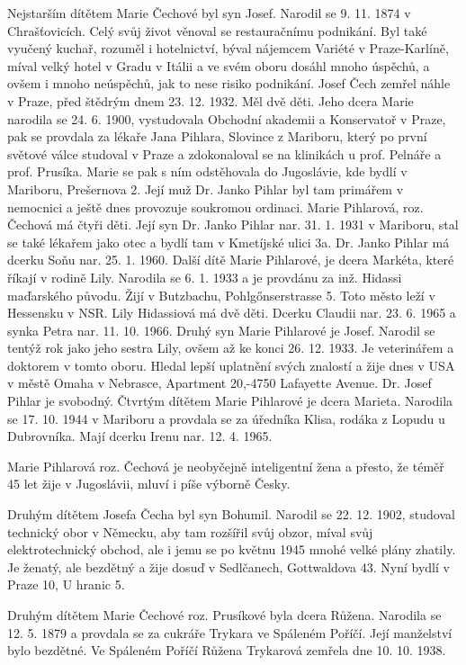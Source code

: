 \documentclass[../dejiny-rodu-prusiku.tex]{subfiles}
\begin{document}
Nejstarším dítětem Marie Čechové byl syn Josef. Narodil se 9. 11. 1874 v Chrašťovicích. Celý svůj život věnoval se restauračnímu podnikání. Byl také vyučený ku­chař, rozuměl i hotelnictví, býval nájemcem Variété v Praze-Karlíně, míval velký hotel v Gradu v Itálii a ve svém oboru dosáhl mnoho úspěchů, a ovšem i mnoho neúspěchů, jak to nese risiko podnikání. Josef Čech zemřel náhle v Praze, před štědrým dnem 23. 12. 1932. Měl dvě děti. Jeho dcera Marie narodila se 24. 6. 1900, vystudovala Obchodní akademii a Konservatoř v Praze, pak se provdala za lékaře Jana Pihlara, Slovince z Mariboru, který po první světové válce studoval v Praze a zdokonaloval se na klinikách u prof. Pelnáře a prof. Prusíka. Marie se pak s ním odstěhovala do Jugoslávie, kde bydlí v Mariboru, Prešernova 2. Její muž Dr. Janko Pihlar byl tam primářem v nemocnici a ještě dnes provozuje soukromou ordinaci. Marie Pihlarová, roz. Čechová má čtyři děti. Její syn Dr. Janko Pihlar nar. 31. 1. 1931 v Mariboru, stal se také lékařem jako otec a bydlí tam v Kmetíjské ulici 3a. Dr. Janko Pihlar má dcerku Soňu nar. 25. 1. 1960. Další dítě Ma­rie Pihlarové, je dcera Markéta, které říkají v rodině Lily. Narodila se 6. 1. 1933 a je provdánu za inž. Hidassi maďarského původu. Žijí v Butzbachu, Pohlgőnserstrasse 5. Toto město leží v Hessensku v NSR. Lily Hidassiová má dvě děti. Dcerku Claudii nar. 23. 6. 1965 a synka Petra nar. 11. 10. 1966. Druhý syn Marie Pihlarové je Josef. Narodil se tentýž rok jako jeho sestra Lily, ovšem až ke konci 26. 12. 1933. Je veterinářem a doktorem v tomto oboru. Hledal lepší uplatnění svých znalostí a žije dnes v USA v městě Omaha v Nebrasce, Apartment 20,-4750 Lafayette Avenue. Dr. Josef Pihlar je svobodný. Čtvrtým dítětem Marie Pihlarové je dcera Marieta. Narodila se 17. 10. 1944 v Mariboru a provdala se za úředníka Klisa, ro­dáka z Lopudu u Dubrovníka. Mají dcerku Irenu nar. 12. 4. 1965.

Marie Pihlarová roz. Čechová je neobyčejně inteligentní žena a přesto, že téměř 45 let žije v Jugoslávii, mluví i píše výborně Česky.

Druhým dítětem Josefa Čecha byl syn Bohumil. Narodil se 22. 12. 1902, studoval technický obor v Německu, aby tam rozšířil svůj obzor, míval svůj elektrotechnický obchod, ale i jemu se po květnu 1945 mnohé velké plány zhatily. Je ženatý, ale bezdětný a žije dosuď v Sedlčanech, Gottwaldova 43. Nyní bydlí v Praze 10, U hranic 5.

Druhým dítětem Marie Čechové roz. Prusíkové byla dcera Růžena. Narodila se 12. 5. 1879 a provdala se za cukráře Trykara ve Spáleném Poříčí. Její manželství bylo bezdětné. Ve Spáleném Poříčí Růžena Trykarová zemřela dne 10. 10. 1938.
\end{document}
